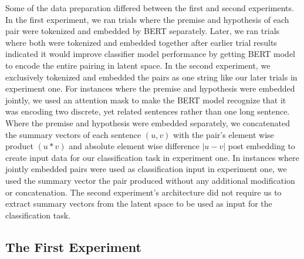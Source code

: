 \documentclass[12pt,letterpaper]{article}
\begin{document}
Some of the data preparation differed between the first and second experiments. In the first experiment, we ran trials where the premise and hypothesis of each pair were tokenized and embedded by BERT separately. Later, we ran trials where both were tokenized and embedded together after earlier trial results indicated it would improve classifier model performance by getting BERT model to encode the entire pairing in latent space. In the second experiment, we exclusively tokenized and embedded the pairs as one string like our later trials in experiment one. For instances where the premise and hypothesis were embedded jointly, we used an attention mask to make the BERT model recognize that it was encoding two discrete, yet related sentences rather than one long sentence. Where the premise and hypothesis were embedded separately, we concatenated the summary vectors of each sentence $(u, v)$ with the pair's element wise product $(u * v)$ and absolute element wise difference $|u -v|$ \citep{conneau_etal_2017_supervised} post embedding to create input data for our classification task in experiment one. In instances where jointly embedded pairs were used as classification input in experiment one, we used the summary vector the pair produced without any additional modification or concatenation. The second experiment's architecture did not require us to extract summary vectors from the latent space to be used as input for the classification task. 





\subsection{The First Experiment}
\end{document}
